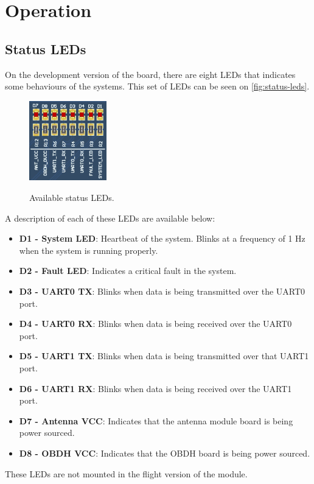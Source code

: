 \section{Operation}

\subsection{Status LEDs}

On the development version of the board, there are eight LEDs that indicates some behaviours of the systems. This set of LEDs can be seen on \autoref{fig:status-leds}.

\begin{figure}[!ht]
    \begin{center}
        \includegraphics[width=0.3\textwidth]{figures/status_leds.png}
        \label{fig:status-leds}
        \caption{Available status LEDs.}
    \end{center}
\end{figure}

A description of each of these LEDs are available below:

\begin{itemize}
    \item \textbf{D1 - System LED}: Heartbeat of the system. Blinks at a frequency of 1 Hz when the system is running properly.
    \item \textbf{D2 - Fault LED}: Indicates a critical fault in the system.
    \item \textbf{D3 - UART0 TX}: Blinks when data is being transmitted over the UART0 port.
    \item \textbf{D4 - UART0 RX}: Blinks when data is being received over the UART0 port.
    \item \textbf{D5 - UART1 TX}: Blinks when data is being transmitted over that UART1 port.
    \item \textbf{D6 - UART1 RX}: Blinks when data is being received over the UART1 port.
    \item \textbf{D7 - Antenna VCC}: Indicates that the antenna module board is being power sourced.
    \item \textbf{D8 - OBDH VCC}: Indicates that the OBDH board is being power sourced.
\end{itemize}

These LEDs are not mounted in the flight version of the module.
